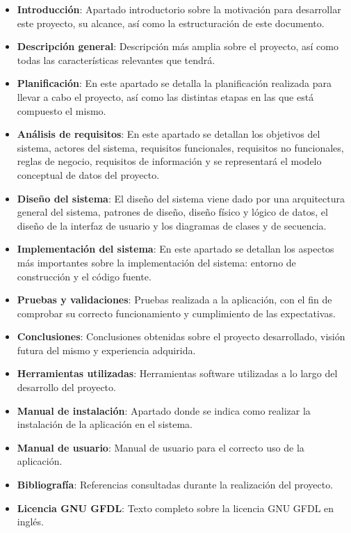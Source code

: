 \begin{itemize}
\item \textbf{Introducción}: Apartado introductorio sobre la motivación para desarrollar este proyecto, su alcance, así como la estructuración de este documento.
\item \textbf{Descripción general}: Descripción más amplia sobre el proyecto, así como todas las características relevantes que tendrá.
\item \textbf{Planificación}: En este apartado se detalla la planificación realizada para llevar a cabo el proyecto, así como las distintas etapas en las que está compuesto el mismo.
\item \textbf{Análisis de requisitos}: En este apartado se detallan los objetivos del sistema, actores del sistema, requisitos funcionales, requisitos no funcionales, reglas de negocio, requisitos de información y se representará el modelo conceptual de datos del proyecto.
\item \textbf{Diseño del sistema}: El diseño del sistema viene dado por una arquitectura general del sistema, patrones de diseño, diseño físico y lógico de datos, el diseño de la interfaz de usuario y los diagramas de clases y de secuencia.
\item \textbf{Implementación del sistema}: En este apartado se detallan los aspectos más importantes sobre la implementación del sistema: entorno de construcción y el código fuente.
\item \textbf{Pruebas y validaciones}: Pruebas realizada a la aplicación, con el fin de comprobar su correcto funcionamiento y cumplimiento de las expectativas.
\item \textbf{Conclusiones}: Conclusiones obtenidas sobre el proyecto desarrollado, visión futura del mismo y experiencia adquirida.
\item \textbf{Herramientas utilizadas}: Herramientas software utilizadas a lo largo del desarrollo del proyecto.
\item \textbf{Manual de instalación}: Apartado donde se indica como realizar la instalación de la aplicación en el sistema.
\item \textbf{Manual de usuario}: Manual de usuario para el correcto uso de la aplicación.
\item \textbf{Bibliografía}: Referencias consultadas durante la realización del proyecto.
\item \textbf{Licencia GNU GFDL}: Texto completo sobre la licencia GNU GFDL en inglés.
\end{itemize}

